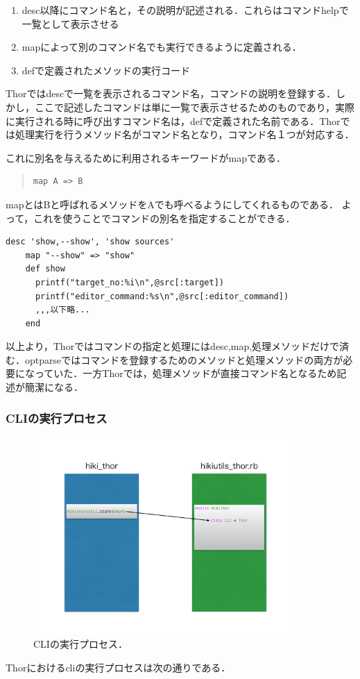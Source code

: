 \begin{enumerate}
\item desc以降にコマンド名と，その説明が記述される．これらはコマンドhelpで一覧として表示させる
\item mapによって別のコマンド名でも実行できるように定義される．
\item defで定義されたメソッドの実行コード
\end{enumerate}
Thorではdescで一覧を表示されるコマンド名，コマンドの説明を登録する．しかし，ここで記述したコマンドは単に一覧で表示させるためのものであり，実際に実行される時に呼び出すコマンド名は，defで定義された名前である．Thorでは処理実行を行うメソッド名がコマンド名となり，コマンド名１つが対応する．

これに別名を与えるために利用されるキーワードがmapである．
\begin{quote}\begin{verbatim}
map A => B
\end{verbatim}\end{quote}
mapとはBと呼ばれるメソッドをAでも呼べるようにしてくれるものである．
よって，これを使うことでコマンドの別名を指定することができる．
\begin{lstlisting}[style=customRuby,basicstyle={\scriptsize\ttfamily}]
    desc 'show,--show', 'show sources'
    map "--show" => "show"
    def show
      printf("target_no:%i\n",@src[:target])
      printf("editor_command:%s\n",@src[:editor_command])
      ,,,以下略...
    end
\end{lstlisting}
以上より，Thorではコマンドの指定と処理にはdesc,map,処理メソッドだけで済む．optparseではコマンドを登録するためのメソッドと処理メソッドの両方が必要になっていた．一方Thorでは，処理メソッドが直接コマンド名となるため記述が簡潔になる．

\subsubsection{CLIの実行プロセス}
\begin{figure}[htbp]\begin{center}
\includegraphics[width=10cm,bb= 0 0 737 553]{../figs/./hikiutils_yamane.006.jpg}
\caption{CLIの実行プロセス．}
\label{default}\end{center}\end{figure}
Thorにおけるcliの実行プロセスは次の通りである．

